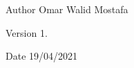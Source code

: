 \begin{DoxyAuthor}{Author}
Omar Walid Mostafa 
\end{DoxyAuthor}
\begin{DoxyVersion}{Version}
1. 
\end{DoxyVersion}
\begin{DoxyDate}{Date}
19/04/2021 
\end{DoxyDate}
